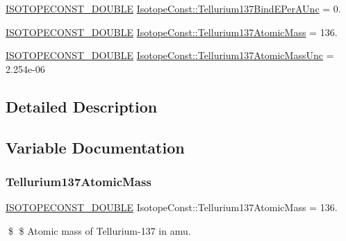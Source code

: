 \begin{DoxyCompactItemize}
\mbox{\hyperlink{group___isotope_const-_macros_ga8f45a7272ce02c0b4c65c44636ed719a}{I\+S\+O\+T\+O\+P\+E\+C\+O\+N\+S\+T\+\_\+\+D\+O\+U\+B\+LE}} \mbox{\hyperlink{group___isotope_const-_tellurium-_te137_ga6725bbf8a6af4538800fc6660cbd39f1}{Isotope\+Const\+::\+Tellurium137\+Bind\+E\+Per\+A\+Unc}} = 0.
\item 
\mbox{\hyperlink{group___isotope_const-_macros_ga8f45a7272ce02c0b4c65c44636ed719a}{I\+S\+O\+T\+O\+P\+E\+C\+O\+N\+S\+T\+\_\+\+D\+O\+U\+B\+LE}} \mbox{\hyperlink{group___isotope_const-_tellurium-_te137_ga9cde40d01dc4733d79a747a31ee3289b}{Isotope\+Const\+::\+Tellurium137\+Atomic\+Mass}} = 136.
\item 
\mbox{\hyperlink{group___isotope_const-_macros_ga8f45a7272ce02c0b4c65c44636ed719a}{I\+S\+O\+T\+O\+P\+E\+C\+O\+N\+S\+T\+\_\+\+D\+O\+U\+B\+LE}} \mbox{\hyperlink{group___isotope_const-_tellurium-_te137_ga570a21d8d9159c582889b7132328087e}{Isotope\+Const\+::\+Tellurium137\+Atomic\+Mass\+Unc}} = 2.\+254e-\/06
\end{DoxyCompactItemize}


\subsection{Detailed Description}


\subsection{Variable Documentation}
\mbox{\label{group___isotope_const-_tellurium-_te137_ga9cde40d01dc4733d79a747a31ee3289b}} 
\subsubsection{\texorpdfstring{Tellurium137\+Atomic\+Mass}{Tellurium137AtomicMass}}
{\footnotesize\ttfamily \mbox{\hyperlink{group___isotope_const-_macros_ga8f45a7272ce02c0b4c65c44636ed719a}{I\+S\+O\+T\+O\+P\+E\+C\+O\+N\+S\+T\+\_\+\+D\+O\+U\+B\+LE}} Isotope\+Const\+::\+Tellurium137\+Atomic\+Mass = 136.}

\$ \$ Atomic mass of Tellurium-\/137 in amu. \mbox{\label{group___isotope_const-_tellurium-_te137_ga570a21d8d9159c582889b7132328087e}} 
